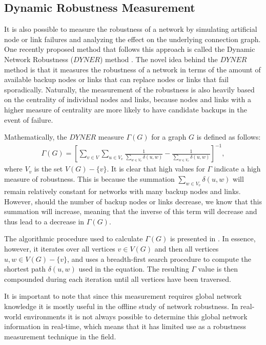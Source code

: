 \documentclass[doc]{apa}%
\begin{document}
\subsection{Dynamic Robustness Measurement}

It is also possible to measure the robustness of a network by simulating artificial node or link failures and analyzing the effect on the underlying connection graph. One recently proposed method that follows this approach is called the Dynamic Network Robustness ($DYNER$) method \cite{singerdynamic}. The novel idea behind the $DYNER$ method is that it measures the robustness of a network in terms of the amount of available backup nodes or links that can replace nodes or links that fail sporadically. Naturally, the measurement of the robustness is also heavily based on the centrality of individual nodes and links, because nodes and links with a higher measure of centrality are more likely to have candidate backups in the event of failure. 

Mathematically, the $DYNER$ measure $\Gamma(G)$ for a graph $G$ is defined as follows:
\begin{eqnarray}
\Gamma(G) = \left[\sum_{v \in V}\sum_{u \in V_v}\frac{1}{\sum_{w \in V_v}\delta(u,w)} - \frac{1}{\sum_{w \in V_v}\delta(u,w)}\right]^{-1},
\end{eqnarray}
where $V_v$ is the set $V(G) - \{v\}$. It is clear that high values for $\Gamma$ indicate a high measure of robustness. This is because the summation $\sum_{w \in V_v}\delta(u,w)$ will remain relatively constant for networks with many backup nodes and links. However, should the number of backup nodes or links decrease, we know that this summation will increase, meaning that the inverse of this term will decrease and thus lead to a decrease in $\Gamma(G)$. 

The algorithmic procedure used to calculate $\Gamma(G)$ is presented in \cite{singerdynamic}. In essence, however, it iterates over all vertices $v \in V(G)$ and then all vertices $u, w \in V(G) - \{v\}$, and uses a breadth-first search procedure to compute the shortest path $\delta(u, w)$ used in the equation. The resulting $\Gamma$ value is then compounded during each iteration until all vertices have been traversed. 

It is important to note that since this measurement requires global network knowledge it is mostly useful in the offline study of network robustness. In real-world environments it is not always possible to determine this global network information in real-time, which means that it has limited use as a robustness measurement technique in the field.
\end{document}
